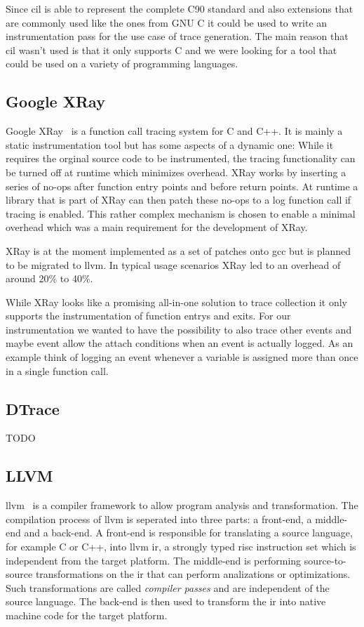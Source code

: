 Since \gls{cil} is able to represent the complete C90 standard and also extensions that are commonly used like the ones from GNU C it could be used to write an instrumentation pass for the use case of trace generation.
The main reason that \gls{cil} wasn't used is that it only supports C and we were looking for a tool that could be used on a variety of programming languages.

\subsection{Google XRay}

Google XRay~\cite{Berris2016} is a function call tracing system for C and C++.
It is mainly a static instrumentation tool but has some aspects of a dynamic one: While it requires the orginal source code to be instrumented, the tracing functionality can be turned off at runtime which minimizes overhead.
XRay works by inserting a series of no-ops after function entry points and before return points.
At runtime a library that is part of XRay can then patch these no-ops to a log function call if tracing is enabled.
This rather complex mechanism is chosen to enable a minimal overhead which was a main requirement for the development of XRay.

XRay is at the moment implemented as a set of patches onto \gls{gcc} but is planned to be migrated to \gls{llvm}.
In typical usage scenarios XRay led to an overhead of around 20\% to 40\%.

While XRay looks like a promising all-in-one solution to trace collection it only supports the instrumentation of function entrys and exits.
For our instrumentation we wanted to have the possibility to also trace other events and maybe event allow the attach conditions when an event is actually logged.
As an example think of logging an event whenever a variable is assigned more than once in a single function call.

\subsection{DTrace}
TODO

\subsection{LLVM}
\label{sec:related:traces:llvm}

\Gls{llvm}~\cite{Lattner2004} is a compiler framework to allow program analysis and transformation.
The compilation process of \gls{llvm} is seperated into three parts: a front-end, a middle-end and a back-end.
A front-end is responsible for translating a source language, for example C or C++, into \gls{llvm} \gls{ir}, a strongly typed \gls{risc} instruction set which is independent from the target platform.
The middle-end is performing source-to-source transformations on the \gls{ir} that can perform analizations or optimizations.
Such transformations are called \emph{compiler passes} and are independent of the source language.
The back-end is then used to transform the \gls{ir} into native machine code for the target platform.

